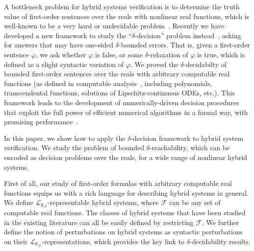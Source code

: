 \documentclass[envcountsect]{llncs}
\newcommand{\lrf}{\mathcal{L}_{\mathbb{R}_{\mathcal{F}}}}
\begin{document}
A bottleneck problem for hybrid systems verification is to determine the truth
value of first-order sentences over the reals with nonlinear real functions,
which is well-known to be a very hard or undecidable problem~\cite{}. Recently
we have developed a new framework to study the ``$\delta$-decision'' problem
instead~\cite{}, asking for answers that may have one-sided $\delta$-bounded
errors. That is, given a first-order sentence $\varphi$, we ask whether
$\varphi$ is false, or some $\delta$-relaxation of $\varphi$ is true, which is
defined as a slight syntactic variation of $\varphi$. We proved the
$\delta$-decidabilty of bounded first-order sentences over the reals with
arbitrary computable real functions (as
defined in computable analysis~\cite{CAbook}, including polynomials,
transcendental functions, solutions of Lipschitz-continuous ODEs, etc.).
This framework leads to the development of numerically-driven decision
procedures that exploit the full power of efficient numerical algorithms in a
formal way, with promising performance~\cite{}.

In this paper, we show how to apply the $\delta$-decision framework to
hybrid system verification. We study the problem of bounded
$\delta$-reachability, which can be encoded as decision
problems over the reals, for a wide range of nonlinear hybrid systems. 

First of all, our study of first-order formulas with arbitrary computable real
functions equips us with a rich language for describing hybrid systems in
general.
We define $\lrf$-representable hybrid systems, where $\mathcal{F}$ can be any
set of computable real functions. The classes of hybrid systems that have been
studied in the existing literature can all be easily defined by restricting
$\mathcal{F}$. We further define the notion of perturbations on hybrid
systems as syntactic perturbations on their $\lrf$-representations, which
provides the key link to $\delta$-decidability results. 
\end{document}
